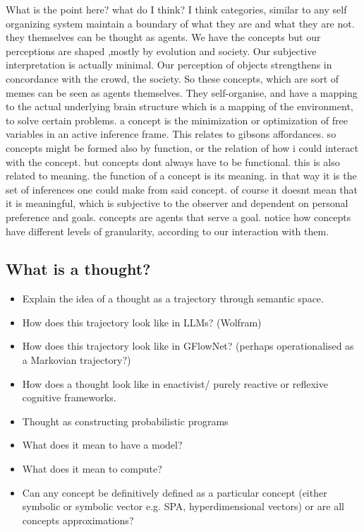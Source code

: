 What is the point here? what do I think? I think categories, similar to any self organizing system maintain a boundary of what they are and what they are not. they themselves can be thought as agents. We have the concepts but our perceptions are shaped ,mostly by evolution and society. Our subjective interpretation is actually minimal. Our perception of objects strengthens in concordance with the crowd, the society. So these concepts, which are sort of memes can be seen as agents themselves. They self-organise, and have a mapping to the actual underlying brain structure which is a mapping of the environment, to solve certain problems. a concept is the minimization or optimization of free variables in an active inference frame. This relates to gibsons affordances. so concepts might be formed also by function, or the relation of how i could interact with the concept. but concepts dont always have to be functional. this is also related to meaning. the function of a concept is its meaning. in that way it is the set of inferences one could make from said concept. of course it doesnt mean that it is meaningful, which is subjective to the observer and dependent on personal preference and goals. concepts are agents that serve a goal. notice how concepts have different levels of granularity, according to our interaction with them. 

\subsection{What is a thought?}
\begin{itemize}
    \item Explain the idea of a thought as a trajectory through semantic space. 
    \item How does this trajectory look like in LLMs? (Wolfram)
    \item How does this trajectory look like in GFlowNet? (perhaps operationalised as a Markovian trajectory?)
    \item How does a thought look like in enactivist/ purely reactive or reflexive cognitive frameworks. 
    \item Thought as constructing probabilistic programs
    \item What does it mean to have a model?
    \item What does it mean to compute?
    \item Can any concept be definitively defined as a particular concept (either symbolic or symbolic vector e.g. SPA, hyperdimensional vectors) or are all concepts approximations?
\end{itemize}

